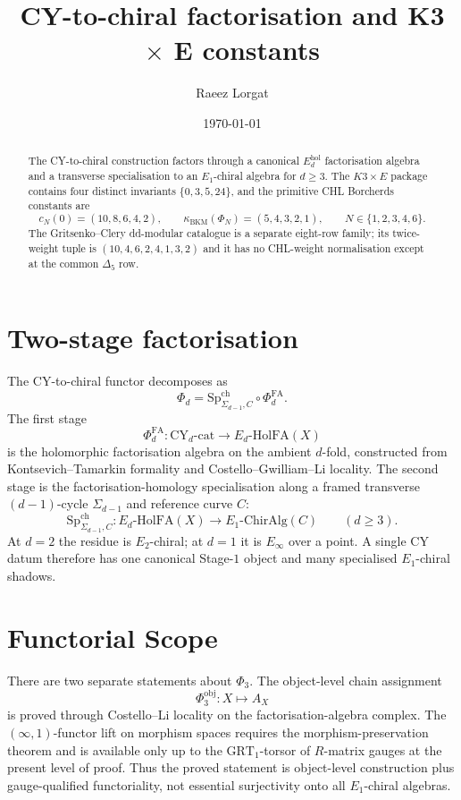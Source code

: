 \documentclass[11pt]{article}
\title{CY-to-chiral factorisation and K3 \texorpdfstring{$\times$}{x} E constants}
\author{Raeez Lorgat}
\date{\today}
\providecommand{\kBKM}{\kappa_{\mathrm{BKM}}}
\providecommand{\Phifa}{\Phi^{\mathrm{FA}}}
\providecommand{\CY}{\mathrm{CY}}
\providecommand{\ChirAlg}{\mathrm{ChirAlg}}
\providecommand{\HolFA}{\mathrm{HolFA}}
\providecommand{\GRT}{\mathrm{GRT}}
\theoremstyle{plain}
\theoremstyle{definition}
\theoremstyle{remark}
\begin{document}
\maketitle

\begin{abstract}
\noindent
The CY-to-chiral construction factors through a canonical
$E_d^{\mathrm{hol}}$ factorisation algebra and a transverse
specialisation to an $E_1$-chiral algebra for $d \geq 3$.  The
$K3\times E$ package contains four distinct invariants
$\{0,3,5,24\}$, and the primitive CHL Borcherds constants are
\[
  c_N(0)=(10,8,6,4,2),\qquad
  \kBKM(\Phi_N)=(5,4,3,2,1),
  \qquad N\in\{1,2,3,4,6\}.
\]
The Gritsenko--Clery dd-modular catalogue is a separate eight-row
family; its twice-weight tuple is $(10,4,6,2,4,1,3,2)$ and it has no
CHL-weight normalisation except at the common $\Delta_5$ row.
\end{abstract}

\tableofcontents

\section{Two-stage factorisation}

The CY-to-chiral functor decomposes as
\[
  \Phi_d
  =
  \mathrm{Sp}^{\mathrm{ch}}_{\Sigma_{d-1},C}\circ \Phifa_d .
\]
The first stage
\[
  \Phifa_d \colon \CY_d\text{-cat}\longrightarrow
  E_d\text{-}\HolFA(X)
\]
is the holomorphic factorisation algebra on the ambient $d$-fold,
constructed from Kontsevich--Tamarkin formality and
Costello--Gwilliam--Li locality.  The second stage is the
factorisation-homology specialisation along a framed transverse
$(d-1)$-cycle $\Sigma_{d-1}$ and reference curve $C$:
\[
  \mathrm{Sp}^{\mathrm{ch}}_{\Sigma_{d-1},C}\colon
  E_d\text{-}\HolFA(X)\longrightarrow E_1\text{-}\ChirAlg(C)
  \qquad (d\geq 3).
\]
At $d=2$ the residue is $E_2$-chiral; at $d=1$ it is
$E_\infty$ over a point.  A single CY datum therefore has one
canonical Stage-$1$ object and many specialised $E_1$-chiral shadows.

\section{Functorial Scope}

There are two separate statements about $\Phi_3$.  The object-level
chain assignment
\[
  \Phi_3^{\mathrm{obj}}\colon X\longmapsto A_X
\]
is proved through Costello--Li locality on the factorisation-algebra
complex.  The $(\infty,1)$-functor lift on morphism spaces requires
the morphism-preservation theorem and is available only up to the
$\GRT_1$-torsor of $R$-matrix gauges at the present level of proof.
Thus the proved statement is object-level construction plus
gauge-qualified functoriality, not essential surjectivity onto all
$E_1$-chiral algebras.
\end{document}
